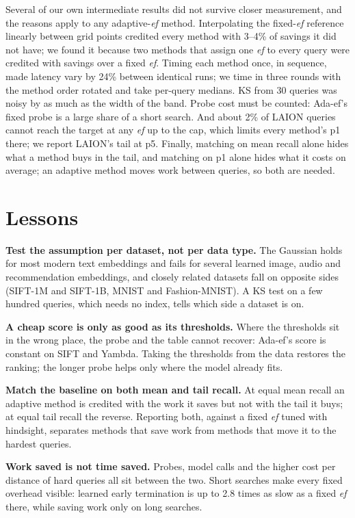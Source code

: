 \documentclass[sigconf,review=false,screen]{acmart}
\newcommand{\ef}{\textit{ef}}
\begin{document}
Several of our own intermediate results did not survive closer measurement, and the reasons apply
to any adaptive-\ef{} method. Interpolating the fixed-\ef{} reference linearly between grid points
credited every method with 3--4\% of savings it did not have; we found it because two methods that
assign one \ef{} to every query were credited with savings over a fixed \ef{}. Timing each method
once, in sequence, made latency vary by 24\% between identical runs; we time in three rounds with
the method order rotated and take per-query medians. KS from 30 queries was noisy by as much as the
width of the band. Probe cost must be counted: Ada-ef's fixed probe is a large share of a short
search. And about 2\% of LAION queries cannot reach the target at any \ef{} up to the cap, which
limits every method's p1 there; we report LAION's tail at p5. Finally, matching on mean recall
alone hides what a method buys in the tail, and matching on p1 alone hides what it costs on average;
an adaptive method moves work between queries, so both are needed.

\section{Lessons}

\textbf{Test the assumption per dataset, not per data type.} The Gaussian holds for most modern
text embeddings and fails for several learned image, audio and recommendation embeddings, and
closely related datasets fall on opposite sides (SIFT-1M and SIFT-1B, MNIST and Fashion-MNIST). A KS
test on a few hundred queries, which needs no index, tells which side a dataset is on.

\textbf{A cheap score is only as good as its thresholds.} Where the thresholds sit in the wrong
place, the probe and the table cannot recover: Ada-ef's score is constant on SIFT and Yambda. Taking
the thresholds from the data restores the ranking; the longer probe helps only where the model
already fits.

\textbf{Match the baseline on both mean and tail recall.} At equal mean recall an adaptive method
is credited with the work it saves but not with the tail it buys; at equal tail recall the reverse.
Reporting both, against a fixed \ef{} tuned with hindsight, separates methods that save work from
methods that move it to the hardest queries.

\textbf{Work saved is not time saved.} Probes, model calls and the higher cost per distance of hard
queries all sit between the two. Short searches make every fixed overhead visible: learned early
termination is up to 2.8 times as slow as a fixed \ef{} there, while saving work only on long
searches.
\end{document}

